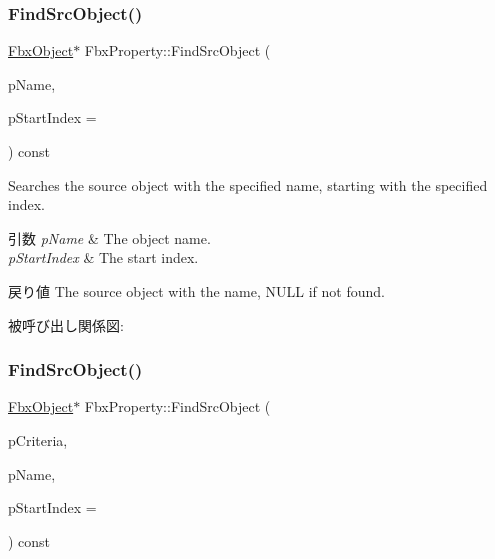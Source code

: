 \subsubsection{\texorpdfstring{Find\+Src\+Object()}{FindSrcObject()}\hspace{0.1cm}{\footnotesize\ttfamily [1/4]}}
{\footnotesize\ttfamily \hyperlink{class_fbx_object}{Fbx\+Object}$\ast$ Fbx\+Property\+::\+Find\+Src\+Object (\begin{DoxyParamCaption}\item[{const char $\ast$}]{p\+Name,  }\item[{const int}]{p\+Start\+Index = {} }\end{DoxyParamCaption}) const}

Searches the source object with the specified name, starting with the specified index. 
\begin{DoxyParams}{引数}
{\em p\+Name} & The object name. \\
\hline
{\em p\+Start\+Index} & The start index. \\
\hline
\end{DoxyParams}
\begin{DoxyReturn}{戻り値}
The source object with the name, N\+U\+LL if not found. 
\end{DoxyReturn}
被呼び出し関係図\+:
\mbox{\label{class_fbx_property_a225b5e5f588ea9a0bacfc03c9843ee15}} 
\subsubsection{\texorpdfstring{Find\+Src\+Object()}{FindSrcObject()}\hspace{0.1cm}{\footnotesize\ttfamily [2/4]}}
{\footnotesize\ttfamily \hyperlink{class_fbx_object}{Fbx\+Object}$\ast$ Fbx\+Property\+::\+Find\+Src\+Object (\begin{DoxyParamCaption}\item[{const \hyperlink{class_fbx_criteria}{Fbx\+Criteria} \&}]{p\+Criteria,  }\item[{const char $\ast$}]{p\+Name,  }\item[{const int}]{p\+Start\+Index = {} }\end{DoxyParamCaption}) const}

